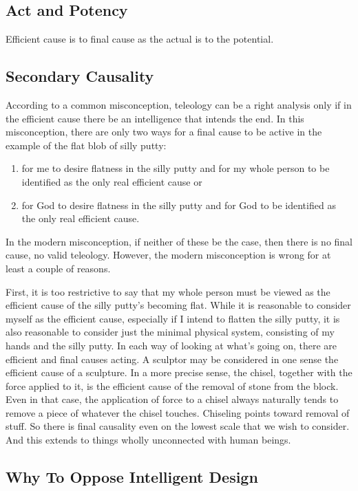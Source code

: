 \documentclass[twocolumn]{article}
\begin{document}
\subsection{Act and Potency}

Efficient cause is to final cause as the actual is to the potential.

\subsection{Secondary Causality}

According to a common misconception, teleology can be a right analysis only if
in the efficient cause there be an intelligence that intends the end.  In this
misconception, there are only two ways for a final cause to be active in the
example of the flat blob of silly putty:
\begin{enumerate}
   \item for me to desire flatness in the silly putty and for my whole person
      to be identified as the only real efficient cause or
   \item for God to desire flatness in the silly putty and for God to be
      identified as the only real efficient cause.
\end{enumerate}
In the modern misconception, if neither of these be the case, then there is no
final cause, no valid teleology.  However, the modern misconception is wrong
for at least a couple of reasons.

First, it is too restrictive to say that my whole person must be viewed as the
efficient cause of the silly putty's becoming flat.  While it is reasonable to
consider myself as the efficient cause, especially if I intend to flatten the
silly putty, it is also reasonable to consider just the minimal physical
system, consisting of my hands and the silly putty.  In each way of looking at
what's going on, there are efficient and final causes acting.  A sculptor may
be considered in one sense the efficient cause of a sculpture.  In a more
precise sense, the chisel, together with the force applied to it, is the
efficient cause of the removal of stone from the block.  Even in that case, the
application of force to a chisel always naturally tends to remove a piece of
whatever the chisel touches.  Chiseling points toward removal of stuff.  So
there is final causality even on the lowest scale that we wish to consider.
And this extends to things wholly unconnected with human beings.

\subsection{Why To Oppose Intelligent Design}
\end{document}
